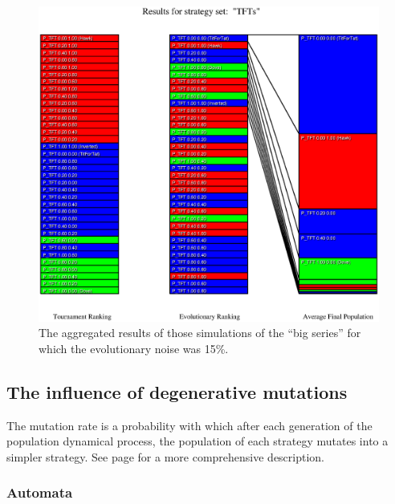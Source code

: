 \begin{figure}
\begin{center}
\includegraphics[width=20cm]{tables/TFTs_N0.150.eps}
\caption{\label{TFTs_N0150} The aggregated results of those
simulations of the ``big series'' for which the evolutionary noise was 15\%.}
\end{center}
\end{figure}


\newpage
\subsection{The influence of degenerative mutations}

The mutation rate is a probability with which after each generation of the
population dynamical process, the population of each strategy
mutates into a simpler strategy. See page \pageref{mutationRate} for a more
comprehensive description.

\subsubsection{Automata}


